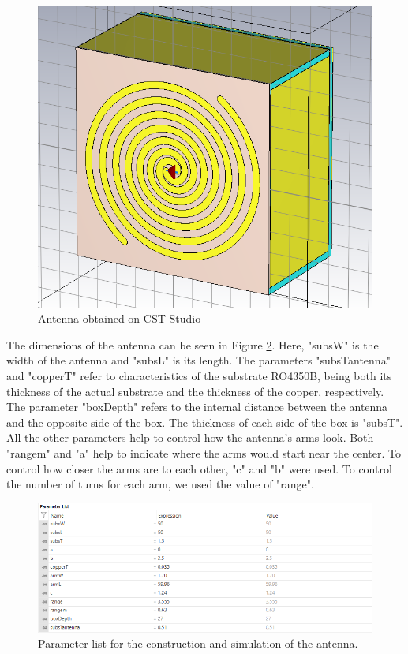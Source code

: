 \begin{figure}[H]
    \vspace*{0cm}
    \centering
    \includegraphics[width=0.5\linewidth]{figs/ch3_antenna.PNG}
    \caption{Antenna obtained on CST Studio}
    \label{fig:ch3_antenna.PNG}
\end{figure}

\par The dimensions of the antenna can be seen in Figure \ref{fig:ch3_parameter_list.PNG}. Here, "subsW" is the width of the antenna and "subsL" is its length. The parameters "subsTantenna" and "copperT" refer to characteristics of the substrate RO4350B, being both its thickness of the actual substrate and the thickness of the copper, respectively. The parameter "boxDepth" refers to the internal distance between the antenna and the opposite side of the box. The thickness of each side of the box is "subsT". All the other parameters help to control how the antenna's arms look. Both "rangem" and "a" help to indicate where the arms would start near the center. To control how closer the arms are to each other, "c" and "b" were used. To control the number of turns for each arm, we used the value of "range".

\begin{figure}[H]
    \vspace*{0cm}
    \centering
    \includegraphics[width=0.9\linewidth]{figs/ch3_parameter_list.PNG}
    \caption{Parameter list for the construction and simulation of the antenna.}
    \label{fig:ch3_parameter_list.PNG}
\end{figure}

